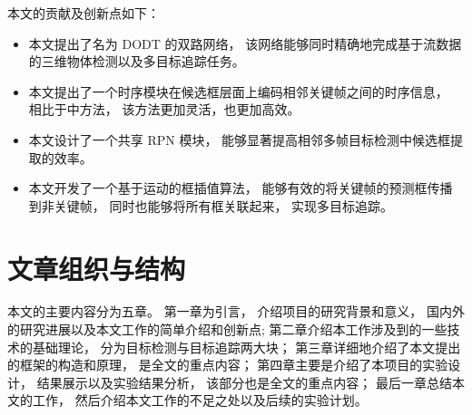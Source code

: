 本文的贡献及创新点如下：
\begin{itemize}
	\item 本文提出了名为 DODT 的双路网络， 该网络能够同时精确地完成基于流数据的三维物体检测以及多目标追踪任务。
	\item 本文提出了一个时序模块在候选框层面上编码相邻关键帧之间的时序信息， 相比于\cite{feichtenhofer2017detect,dosovitskiy2015flownet}中方法， 该方法更加灵活，也更加高效。
	\item 本文设计了一个共享 RPN 模块， 能够显著提高相邻多帧目标检测中候选框提取的效率。
	\item 本文开发了一个基于运动的框插值算法， 能够有效的将关键帧的预测框传播到非关键帧， 同时也能够将所有框关联起来， 实现多目标追踪。
\end{itemize}


\section{文章组织与结构}
\label{subsec:structure}
本文的主要内容分为五章。 第一章为引言， 介绍项目的研究背景和意义， 国内外的研究进展以及本文工作的简单介绍和创新点; 第二章介绍本工作涉及到的一些技术的基础理论， 分为目标检测与目标追踪两大块； 第三章详细地介绍了本文提出的框架的构造和原理， 是全文的重点内容； 第四章主要是介绍了本项目的实验设计， 结果展示以及实验结果分析， 该部分也是全文的重点内容； 最后一章总结本文的工作， 然后介绍本文工作的不足之处以及后续的实验计划。 


\ifprint
	\newpage
	\thispagestyle{empty}
	\mbox{}
	
	\clearpage
	\setcounter{page}{10}
\fi